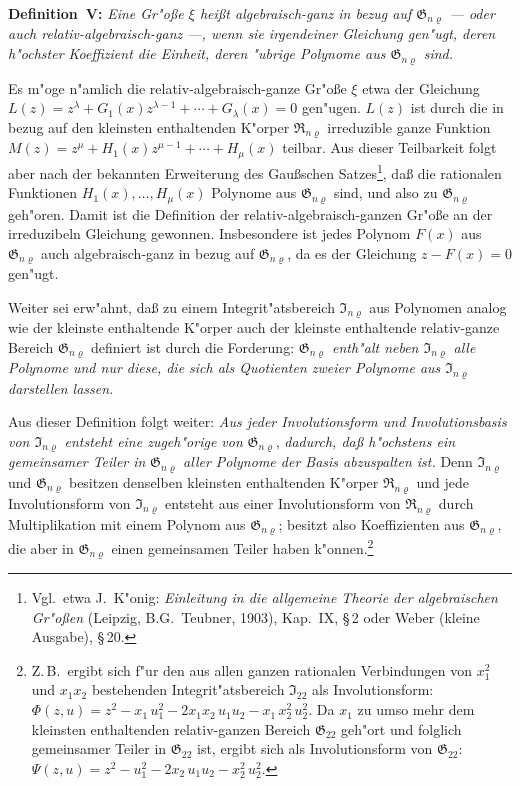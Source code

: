 \documentclass[11pt,a4paper]{article}
\begin{document}
\medskip
\noindent
\textbf{Definition~V:} \emph{Eine Gr"{o}\ss{}e $\xi$ hei\ss{}t \emph{algebraisch-ganz} in bezug
auf $\mathfrak{G}_{n\varrho}$ --- oder auch \emph{relativ-algebraisch-ganz} ---, wenn sie irgendeiner
Gleichung gen"{u}gt, deren h"{o}chster Koeffizient die Einheit, deren "{u}brige
Polynome aus $\mathfrak{G}_{n\varrho}$ sind.}

Es m"{o}ge n"{a}mlich die relativ-algebraisch-ganze Gr"{o}\ss{}e $\xi$ etwa der
Gleichung
$L(z)=z^{\lambda}+G_{1}(x)z^{\lambda-1}+\cdots+G_{\lambda}(x)=0$
gen"{u}gen. $L(z)$ ist durch die in bezug auf den kleinsten enthaltenden
K"{o}rper $\mathfrak{R}_{n\varrho}$ irreduzible ganze Funktion
$M(z)=z^{\mu}+H_{1}(x)z^{\mu-1}+\cdots+H_{\mu}(x)$
teilbar. Aus dieser Teilbarkeit folgt aber nach der bekannten Erweiterung
des Gau\ss{}schen Satzes\footnote{Vgl.\ etwa J.~K"{o}nig: \emph{Einleitung in die
allgemeine Theorie der algebraischen Gr"{o}\ss{}en} (Leipzig, B.G.\ Teubner, 1903),
Kap.~IX, \S\,2 oder Weber (kleine Ausgabe), \S\,20.}, da\ss{} die rationalen Funktionen
$H_{1}(x),\dots,H_{\mu}(x)$ Polynome aus $\mathfrak{G}_{n\varrho}$ sind, und also zu $\mathfrak{G}_{n\varrho}$ geh"{o}ren.
Damit ist die Definition der relativ-algebraisch-ganzen Gr"{o}\ss{}e an der
irreduzibeln Gleichung gewonnen. Insbesondere ist jedes Polynom $F(x)$
aus $\mathfrak{G}_{n\varrho}$ auch algebraisch-ganz in bezug auf $\mathfrak{G}_{n\varrho}$, da es der Gleichung
$z-F(x)=0$ gen"{u}gt.

Weiter sei erw"{a}hnt, da\ss{} zu einem Integrit"{a}tsbereich $\mathfrak{I}_{n\varrho}$ aus Polynomen
analog wie der kleinste enthaltende K"{o}rper auch der kleinste enthaltende
relativ-ganze Bereich $\mathfrak{G}_{n\varrho}$ definiert ist durch die Forderung:
\emph{$\mathfrak{G}_{n\varrho}$ enth"{a}lt neben $\mathfrak{I}_{n\varrho}$ alle Polynome und nur diese, die sich als Quotienten
zweier Polynome aus $\mathfrak{I}_{n\varrho}$ darstellen lassen.}

Aus dieser Definition folgt weiter: \emph{Aus jeder Involutionsform und
Involutionsbasis von $\mathfrak{I}_{n\varrho}$ entsteht eine zugeh"{o}rige von} $\mathfrak{G}_{n\varrho}$, \emph{dadurch, da\ss{}
h"{o}chstens ein gemeinsamer Teiler in} $\mathfrak{G}_{n\varrho}$ \emph{aller Polynome der Basis
abzuspalten ist.} Denn $\mathfrak{I}_{n\varrho}$ und $\mathfrak{G}_{n\varrho}$ besitzen denselben kleinsten enthaltenden
K"{o}rper $\mathfrak{R}_{n\varrho}$ und jede Involutionsform von $\mathfrak{I}_{n\varrho}$ entsteht aus einer Involutionsform
von $\mathfrak{R}_{n\varrho}$ durch Multiplikation mit einem Polynom aus $\mathfrak{G}_{n\varrho}$; besitzt also
Koeffizienten aus $\mathfrak{G}_{n\varrho}$, die aber in $\mathfrak{G}_{n\varrho}$ einen gemeinsamen Teiler haben
k"{o}nnen.\footnote{Z.\,B.\ ergibt sich f"{u}r den aus allen ganzen rationalen
Verbindungen von $x_{1}^{2}$ und $x_{1}x_{2}$ bestehenden Integrit"{a}tsbereich $\mathfrak{I}_{22}$ als Involutionsform:
$\Phi(z,u)=z^{2}-x_{1}\,u_{1}^{2}-2x_{1}x_{2}\,u_{1}u_{2}-x_{1}\,x_{2}^{2}\,u_{2}^{2}$.
Da $x_{1}$ zu umso mehr dem kleinsten enthaltenden relativ-ganzen Bereich $\mathfrak{G}_{22}$
geh"{o}rt und folglich gemeinsamer Teiler in $\mathfrak{G}_{22}$ ist, ergibt sich als Involutionsform
von $\mathfrak{G}_{22}$: $\Psi(z,u)=z^{2}-u_{1}^{2}-2x_{2}\,u_{1}u_{2}-x_{2}^{2}\,u_{2}^{2}$.}
\end{document}
